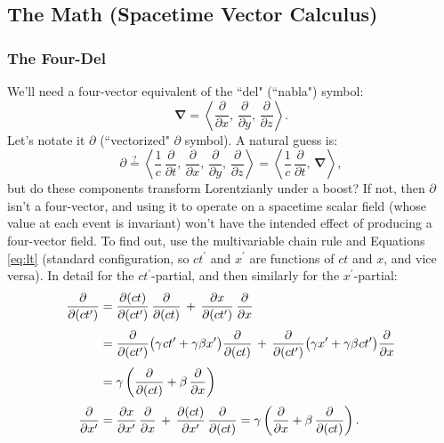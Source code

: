 \documentclass[12pt]{article}
\newcommand{\del}{\boldsymbol{\nabla}}
\begin{document}
\subsection{The Math (Spacetime Vector Calculus)}


\subsubsection{The Four-Del}\label{sssec:fd}

We'll need a four-vector equivalent of the ``del" (``nabla") symbol:
\begin{equation*}
\del = \left \langle \dfrac{\partial}{\partial x}, \, \dfrac{\partial}{\partial y}, \, \dfrac{\partial}{\partial z} \right \rangle .
\end{equation*}
Let's notate it $\partialup$ (``vectorized" $\partial$ symbol). A natural guess is:
\begin{equation*}
\partialup \stackrel{?}{=} \left \langle \dfrac{1}{c} \, \dfrac{\partial}{\partial t} , \, \dfrac{\partial}{\partial x}, \, \dfrac{\partial}{\partial y}, \, \dfrac{\partial}{\partial z} \right \rangle = \left \langle \dfrac{1}{c} \, \dfrac{\partial}{\partial t} , \, \del \right \rangle ,
\end{equation*}
but do these components transform Lorentzianly under a boost? If not, then $\partialup$ isn't a four-vector, and using it to operate on a spacetime scalar field (whose value at each event is invariant) won't have the intended effect of producing a four-vector field. To find out, use the multivariable chain rule and Equations \ref{eq:lt} (standard configuration, so $ct^\prime$ and $x^\prime$ are functions of $ct$ and $x$, and vice versa). In detail for the $ct^\prime$-partial, and then similarly for the $x^\prime$-partial:
\begin{equation*}
\begin{split}
\dfrac{\partial}{\partial (ct^\prime)} &= \dfrac{\partial (ct)}{\partial (ct^\prime)} \, \dfrac{\partial}{\partial (ct)} \, + \, \dfrac{\partial x}{\partial (ct^\prime)} \, \dfrac{\partial}{\partial x} \\[3pt] &= \dfrac{\partial}{\partial (ct^\prime)} \big( \gamma \mkern1mu ct^\prime + \gamma \beta x^\prime \big) \dfrac{\partial}{\partial (ct)} \, + \, \dfrac{\partial}{\partial (ct^\prime)} \big( \gamma x^\prime + \gamma \beta \mkern1mu ct^\prime \big) \dfrac{\partial}{\partial x} \\[3pt] &= \gamma \left( \dfrac{\partial}{\partial (ct)} + \beta \, \dfrac{\partial}{\partial x} \right) \\[3pt]
\dfrac{\partial}{\partial x^\prime} &= \dfrac{\partial x}{\partial x^\prime} \, \dfrac{\partial}{\partial x} \, + \, \dfrac{\partial (ct)}{\partial x^\prime} \, \dfrac{\partial}{\partial (ct)}  = \gamma \left( \dfrac{\partial}{\partial x} + \beta \, \dfrac{\partial}{\partial (ct)}  \right) .
\end{split}
\end{equation*}
\end{document}
